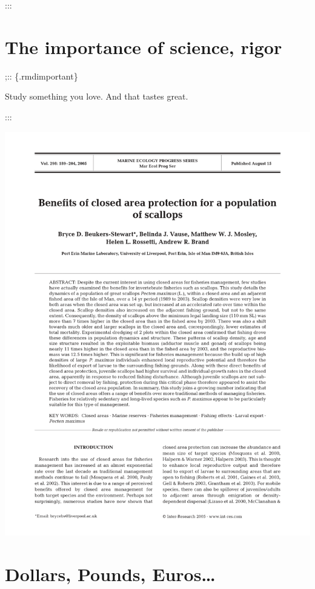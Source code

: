 \documentclass[
]{book}
\begin{document}
:::

\hypertarget{the-importance-of-science-rigor}{%
\chapter{The importance of science, rigor}\label{the-importance-of-science-rigor}}

;:: \{.rmdimportant\}

Study something you love. And that tastes great.

:::

\begin{center}\includegraphics{_images/benefits} \end{center}

\hypertarget{dollars-pounds-euros}{%
\chapter{Dollars, Pounds, Euros\ldots{}}\label{dollars-pounds-euros}}
\end{document}
